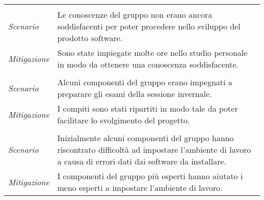 {\def\tabularxcolumn#1{m{#1}}
{
	
	\begin{center}
		\renewcommand{\arraystretch}{1.4}
		\begin{longtable}{|p{5cm}|p{12cm}|}
			\hline
			\rowcolor{airforceblue}
			\multicolumn{2}{|c|}{\textbf{Periodo di Consolidamento dei requisiti}}\\
			\hline
			\rowcolor{airforceblue}
			\multicolumn{2}{|c|}{\textit{RT1- Inesperienza tecnologica}}\\
			\hline
			\textit{Scenario} & Le conoscenze del gruppo non erano ancora soddisfacenti per poter procedere nello sviluppo del prodotto software. \\
			\hline
			\textit{Mitigazione} & Sono state impiegate molte ore nello studio personale in modo da ottenere una conoscenza soddisfacente. \\
			\hline
			\rowcolor{airforceblue}
			\multicolumn{2}{|c|}{\textit{RO2- Impegni personali}}\\
			\hline
			\textit{Scenario} & Alcuni componenti del gruppo erano impegnati a preparare gli esami della sessione invernale. \\
			\hline
			\textit{Mitigazione} & I compiti sono stati ripartiti in modo tale da poter facilitare lo svolgimento del progetto. \\
			\hline
			\rowcolor{airforceblue}
			\multicolumn{2}{|c|}{\textit{RT2- Software di terze parti}}\\
			\hline
			\textit{Scenario} & Inizialmente alcuni componenti del gruppo hanno riscontrato difficoltà ad impostare l'ambiente di lavoro a causa di errori dati dai software da installare. \\
			\hline
			\textit{Mitigazione} & I componenti del gruppo più esperti hanno aiutato i meno esperti a impostare l'ambiente di lavoro. \\
			\hline
		\end{longtable}
	\end{center}

\def\tabularxcolumn#1{m{#1}}
{
	
}}}
